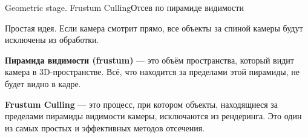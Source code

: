 \documentclass{beamer}
\begin{document}
	\begin{frame}{Geometric stage. Frustum Culling}{Отсев по пирамиде видимости}

	Простая идея. Если камера смотрит прямо, все объекты за спиной камеры будут исключены из обработки.

	\textbf{Пирамида видимости (frustum)} --- это объём пространства, который видит камера в 3D-пространстве. Всё, что находится за пределами этой пирамиды, не будет видно в кадре.

	\textbf{Frustum Culling} --- это процесс, при котором объекты, находящиеся за пределами пирамиды видимости камеры, исключаются из рендеринга. Это один из самых простых и эффективных методов отсечения.



	\end{frame}
\end{document}
